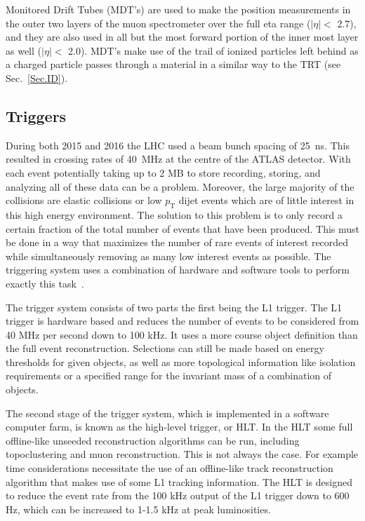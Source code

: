 Monitored Drift Tubes (MDT's) are used to make the position measurements in the outer two layers of the muon spectrometer over the full eta range ($\mid\eta\mid<$ 2.7), and they are also used in all but the most forward portion of the inner most layer as well ($\mid\eta\mid<$ 2.0).  
MDT's make use of the trail of ionized particles left behind as a charged particle passes through a material in a similar way to the TRT (see Sec.~\ref{Sec.ID}).  
 
 

\subsection{Triggers}
\label{Trig}
During both 2015 and 2016 the LHC used a beam bunch spacing of 25~ns.  
This resulted in crossing rates of 40~MHz at the centre of the ATLAS detector.  
With each event potentially taking up to 2 MB to store recording, storing, and analyzing all of these data can be a problem.  
Moreover, the large majority of the collisions are elastic collisions or low $p_{\mathrm T}$ dijet events which are of little interest in this high energy environment.  
The solution to this problem is to only record a certain fraction of the total number of events that have been produced.  
This must be done in a way that maximizes the number of rare events of interest recorded while simultaneously removing as many low interest events as possible.  
The triggering system uses a combination of hardware and software tools to perform exactly this task~\cite{Run2Triggers}.  

The trigger system consists of two parts the first being the L1 trigger.  
The L1 trigger is hardware based and reduces the number of events to be considered from 40 MHz per second down to 100 kHz.  
It uses a more course object definition than the full event reconstruction.  
Selections can still be made based on energy thresholds for given objects, as well as more topological information like isolation requirements or a specified range for the invariant mass of a combination of objects.  

The second stage of the trigger system, which is implemented in a software computer farm, is known as the high-level trigger, or HLT.  
In the HLT some full offline-like unseeded reconstruction algorithms can be run, including topoclustering and muon reconstruction.  
This is not always the case.  
For example time considerations necessitate the use of an offline-like track reconstruction algorithm that makes use of some L1 tracking information.  
The HLT is designed to reduce the event rate from the 100 kHz output of the L1 trigger down to 600 Hz, which can be increased to 1-1.5 kHz at peak luminosities.  

